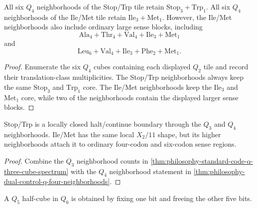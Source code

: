 \begin{theorem}
\label{thm:philosophy-dual-control-q-four-neighborhoods}
All six $Q_{4}$ neighborhoods of the Stop/Trp tile retain
$\mathrm{Stop}_{3}+\mathrm{Trp}_{1}$. All six $Q_{4}$ neighborhoods of
the Ile/Met tile retain $\mathrm{Ile}_{3}+\mathrm{Met}_{1}$.
However, the Ile/Met neighborhoods also include ordinary large sense
blocks, including
$$
  \mathrm{Ala}_{4}+\mathrm{Thr}_{4}+\mathrm{Val}_{4}
  +\mathrm{Ile}_{3}+\mathrm{Met}_{1}
$$
and
$$
  \mathrm{Leu}_{6}+\mathrm{Val}_{4}
  +\mathrm{Ile}_{3}+\mathrm{Phe}_{2}+\mathrm{Met}_{1}.
$$
\end{theorem}
\begin{proof}
Enumerate the six $Q_{4}$ cubes containing each displayed $Q_{2}$ tile
and record their translation-class multiplicities. The Stop/Trp
neighborhoods always keep the same $\mathrm{Stop}_{3}$ and
$\mathrm{Trp}_{1}$ core. The Ile/Met neighborhoods keep the
$\mathrm{Ile}_{3}$ and $\mathrm{Met}_{1}$ core, while two of the
neighborhoods contain the displayed larger sense blocks.
\end{proof}

\begin{corollary}
\label{cor:philosophy-boundary-entry-tile-q-four-distinction}
Stop/Trp is a locally closed halt/continue boundary through the
$Q_{3}$ and $Q_{4}$ neighborhoods. Ile/Met has the same local $X_{2}/11$
shape, but its higher neighborhoods attach it to ordinary four-codon and
six-codon sense regions.
\end{corollary}
\begin{proof}
Combine the $Q_{3}$ neighborhood counts in
\autoref{thm:philosophy-standard-code-q-three-cube-spectrum} with the
$Q_{4}$ neighborhood statement in
\autoref{thm:philosophy-dual-control-q-four-neighborhoods}.
\end{proof}

\begin{definition}
\label{def:philosophy-control-half-cube}
A $Q_{5}$ half-cube in $Q_{6}$ is obtained by fixing one bit and freeing
the other five bits.
\end{definition}

